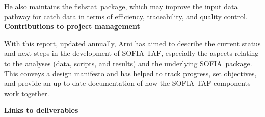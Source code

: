 \documentclass[12pt]{article}
\newcommand\fishstat{{\sf fishstat}}
\newcommand\SOFIA{{\sf SOFIA}}
\begin{document}
He also maintains the \fishstat\ package, which may improve the input data
pathway for catch data in terms of efficiency, traceability, and quality
control.\\[-2ex]

\textbf{Contributions to project management}

With this report, updated annually, Arni has aimed to describe the current
status and next steps in the development of SOFIA-TAF, especially the aspects
relating to the analyses (data, scripts, and results) and the underlying \SOFIA\
package. This conveys a design manifesto and has helped to track progress, set
objectives, and provide an up-to-date documentation of how the SOFIA-TAF
components work together.

\newpage

\textbf{Links to deliverables}
\end{document}
